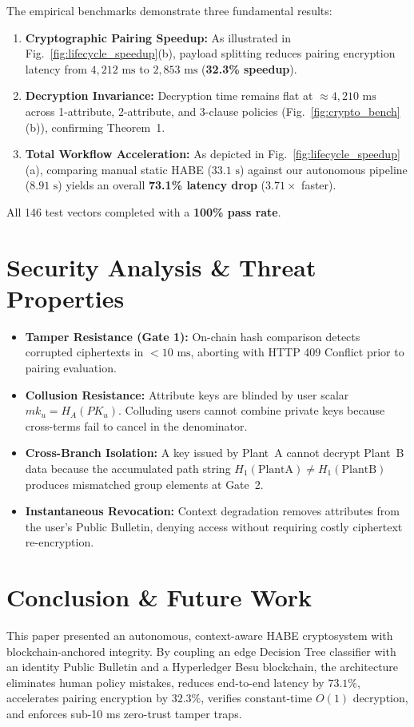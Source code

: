\documentclass[conference]{IEEEtran}
\begin{document}
The empirical benchmarks demonstrate three fundamental results:
\begin{enumerate}
    \item \textbf{Cryptographic Pairing Speedup:} As illustrated in Fig.~\ref{fig:lifecycle_speedup}(b), payload splitting reduces pairing encryption latency from $4,212\text{ ms}$ to $2,853\text{ ms}$ (\textbf{32.3\% speedup}).
    \item \textbf{Decryption Invariance:} Decryption time remains flat at $\approx 4,210\text{ ms}$ across 1-attribute, 2-attribute, and 3-clause policies (Fig.~\ref{fig:crypto_bench}(b)), confirming Theorem~1.
    \item \textbf{Total Workflow Acceleration:} As depicted in Fig.~\ref{fig:lifecycle_speedup}(a), comparing manual static HABE ($33.1\text{ s}$) against our autonomous pipeline ($8.91\text{ s}$) yields an overall \textbf{73.1\% latency drop} ($3.71\times$ faster).
\end{enumerate}
All 146 test vectors completed with a \textbf{100\% pass rate}.

\section{Security Analysis \& Threat Properties}
\begin{itemize}
    \item \textbf{Tamper Resistance (Gate 1):} On-chain hash comparison detects corrupted ciphertexts in $<10\text{ ms}$, aborting with HTTP 409 Conflict prior to pairing evaluation.
    \item \textbf{Collusion Resistance:} Attribute keys are blinded by user scalar $mk_u = H_A(PK_u)$. Colluding users cannot combine private keys because cross-terms fail to cancel in the denominator.
    \item \textbf{Cross-Branch Isolation:} A key issued by Plant~A cannot decrypt Plant~B data because the accumulated path string $H_1(\text{PlantA}) \neq H_1(\text{PlantB})$ produces mismatched group elements at Gate~2.
    \item \textbf{Instantaneous Revocation:} Context degradation removes attributes from the user's Public Bulletin, denying access without requiring costly ciphertext re-encryption.
\end{itemize}

\section{Conclusion \& Future Work}
This paper presented an autonomous, context-aware HABE cryptosystem with blockchain-anchored integrity. By coupling an edge Decision Tree classifier with an identity Public Bulletin and a Hyperledger Besu blockchain, the architecture eliminates human policy mistakes, reduces end-to-end latency by $73.1\%$, accelerates pairing encryption by $32.3\%$, verifies constant-time $O(1)$ decryption, and enforces sub-10 ms zero-trust tamper traps.
\end{document}

